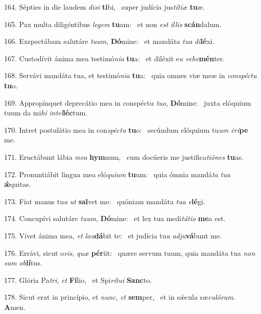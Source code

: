 164. Sépties in die laudem \textit{di}\textit{xi} \textbf{ti}bi, \ast\  super judícia jus\textit{tí}\textit{ti}\textit{æ} \textbf{tu}æ.\

165. Pax multa diligéntibus \textit{le}\textit{gem} \textbf{tu}am: \ast\  et non \textit{est} \textit{il}\textit{lis} \textbf{scán}dalum.\

166. Exspectábam salutáre \textit{tu}\textit{um}, \textbf{Dó}mine: \ast\  et mandáta \textit{tu}\textit{a} \textit{di}\textbf{lé}xi.\

167. Custodívit ánima mea testimó\textit{ni}\textit{a} \textbf{tu}a: \ast\  et diléxit e\textit{a} \textit{ve}\textit{he}\textbf{mén}ter.\

168. Servávi mandáta tua, et testimó\textit{ni}\textit{a} \textbf{tu}a: \ast\  quia omnes viæ meæ in \textit{con}\textit{spéc}\textit{tu} \textbf{tu}o.\

169. Appropínquet deprecátio mea in conspéctu \textit{tu}\textit{o}, \textbf{Dó}mine: \ast\  juxta elóquium tuum da mi\textit{hi} \textit{in}\textit{tel}\textbf{léc}tum.\

170. Intret postulátio mea in con\textit{spéc}\textit{tu} \textbf{tu}o: \ast\  secúndum elóquium tu\textit{um} \textit{é}\textit{ri}\textbf{pe} me.\

171. Eructábunt lábia \textit{me}\textit{a} \textbf{hym}num, \ast\  cum docúeris me justifica\textit{ti}\textit{ó}\textit{nes} \textbf{tu}as.\

172. Pronuntiábit lingua mea eló\textit{qui}\textit{um} \textbf{tu}um: \ast\  quia ómnia mandá\textit{ta} \textit{tu}\textit{a} \textbf{ǽ}quitas.\

173. Fiat manus tu\textit{a} \textit{ut} \textbf{sal}vet me: \ast\  quóniam mandáta \textit{tu}\textit{a} \textit{e}\textbf{lé}gi.\

174. Concupívi salutáre \textit{tu}\textit{um}, \textbf{Dó}mine: \ast\  et lex tua medi\textit{tá}\textit{ti}\textit{o} \textbf{me}a est.\

175. Vivet ánima mea, \textit{et} \textit{lau}\textbf{dá}bit te: \ast\  et judícia tu\textit{a} \textit{ad}\textit{ju}\textbf{vá}bunt me.\

176. Errávi, sicut o\textit{vis}, \textit{quæ} \textbf{pér}iit: \ast\  quære servum tuum, quia mandáta tua \textit{non} \textit{sum} \textit{ob}\textbf{lí}tus.\

177. Glória Pa\textit{tri}, \textit{et} \textbf{Fí}lio, \ast\  et Spi\textit{rí}\textit{tu}\textit{i} \textbf{Sanc}to.\

178. Sicut erat in princípio, et \textit{nunc}, \textit{et} \textbf{sem}per, \ast\  et in sǽcula sæ\textit{cu}\textit{ló}\textit{rum}. \textbf{A}men.\

